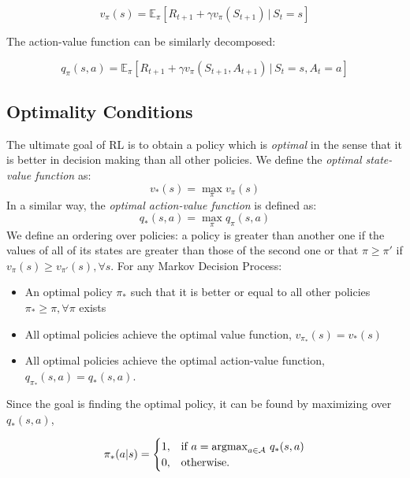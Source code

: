 \begin{equation}
	v_\pi(s) = \mathbb{E}_\pi[R_{t+1} + \gamma v_\pi (S_{t+1})\, | \, S_t = s]
\end{equation}

The action-value function can be similarly decomposed:

\begin{equation}
	q_\pi(s,a) = \mathbb{E}_\pi[R_{t+1} + \gamma v_\pi (S_{t+1},A_{t+1})\, | \, S_t = s, A_t = a]
\end{equation}

\subsection{Optimality Conditions}
The ultimate goal of RL is to obtain a policy which is \textit{optimal} in the sense that it is better in decision making than all other policies. We define the \textit{optimal state-value function} as:
\begin{equation}
	v_*(s) = \max_\pi v_\pi(s)
\end{equation}
In a similar way, the \textit{optimal action-value function} is defined as:
\begin{equation}
	q_*(s,a) = \max_\pi q_\pi (s,a)
\end{equation}
We define an ordering over policies: a policy is greater than another one if the values of all of its states are greater than those of the second one or that $\pi \geq \pi'$ if $v_\pi(s) \geq v_{\pi'}(s), \forall s$. For any Markov Decision Process:

\begin{itemize}
	\item An optimal policy $\pi_*$ such that it is better or equal to all other policies $\pi_* \geq \pi, \forall \pi$ exists
	\item All optimal policies achieve the optimal value function, $v_{\pi_*}(s)=v_*(s)$
	\item All optimal policies achieve the optimal action-value function, $q_{\pi_*}(s,a)=q_*(s,a)$.
\end{itemize}

Since the goal is finding the optimal policy, it can be found by maximizing over $q_*(s,a)$,

\begin{equation}
	\pi_*(a|s) = \begin{cases}
	1, & \text{if $a = \operatorname*{argmax}_{a \in \mathcal{A}} \, q_*(s,a)$}\\
	0, & \text{otherwise}.
	\end{cases}
\end{equation}

